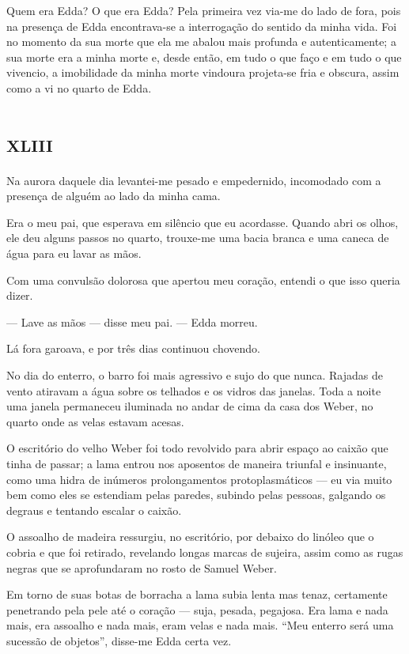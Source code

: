 Quem era Edda? O que era Edda? Pela primeira vez via-me do lado de fora, pois na presença de Edda encontrava-se a interrogação do sentido da minha vida. Foi no momento da sua morte que ela me abalou mais profunda e autenticamente; a sua morte era a minha morte e, desde então, em tudo o que faço e em tudo o que vivencio, a imobilidade da minha morte vindoura projeta-se fria e obscura, assim como a vi no quarto de Edda.


\chapter*{\huge\centering\textsc{xliii}}

Na aurora daquele dia levantei-me pesado e empedernido, incomodado com a presença de alguém ao lado da minha cama.

Era o meu pai, que esperava em silêncio que eu acordasse. Quando abri os olhos, ele deu alguns passos no quarto, trouxe-me uma bacia branca e uma caneca de água para eu lavar as mãos.

Com uma convulsão dolorosa que apertou meu coração, entendi o que isso queria dizer.

--- Lave as mãos --- disse meu pai. --- Edda morreu.

Lá fora garoava, e por três dias continuou chovendo.

No dia do enterro, o barro foi mais agressivo e sujo do que nunca. Rajadas de vento atiravam a água sobre os telhados e os vidros das janelas. Toda a noite uma janela permaneceu iluminada no andar de cima da casa dos Weber, no quarto onde as velas estavam acesas.

O escritório do velho Weber foi todo revolvido para abrir espaço ao caixão que tinha de passar; a lama entrou nos aposentos de maneira triunfal e insinuante, como uma hidra de inúmeros prolongamentos protoplasmáticos --- eu via muito bem como eles se estendiam pelas paredes, subindo pelas pessoas, galgando os degraus e tentando escalar o caixão.

O assoalho de madeira ressurgiu, no escritório, por debaixo do linóleo que o cobria e que foi retirado, revelando longas marcas de sujeira, assim como as rugas negras que se aprofundaram no rosto de Samuel Weber.

Em torno de suas botas de borracha a lama subia lenta mas tenaz, certamente penetrando pela pele até o coração --- suja, pesada, pegajosa. Era lama e nada mais, era assoalho e nada mais, eram velas e nada mais. ``Meu enterro será uma sucessão de objetos'', disse-me Edda certa vez.

